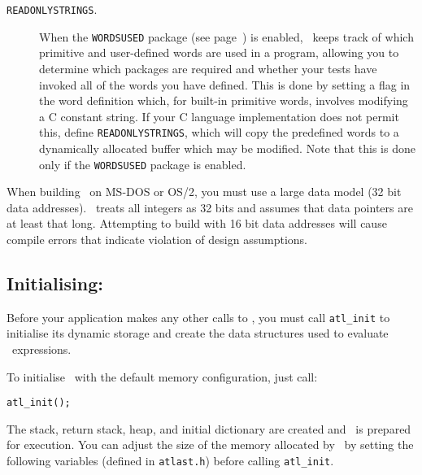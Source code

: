 \documentclass[twocolumn]{article}
\begin{document}
\begin{description}
\item[{\tt READONLYSTRINGS}.] When the {\tt WORDSUSED} package (see
		    page~\pageref{`wordsused'}) is enabled, \atlast\ 
		    keeps track of which primitive and user-defined
		    words are used in a program, allowing you to
		    determine which packages are required and whether
		    your tests have invoked all of the words you have
		    defined. This is done by setting a flag in the
		    word definition which, for built-in primitive
		    words, involves modifying a C constant string.  If
		    your C language implementation does not permit
		    this, define {\tt READONLYSTRINGS}, which will
		    copy the predefined words to a dynamically
		    allocated buffer which may be modified. Note that
		    this is done only if the {\tt WORDSUSED} package
		    is enabled.

\end{description}

When building \atlast\ on MS-DOS or OS/2, you must use a large data
model (32 bit data addresses).  \atlast\ treats all integers as 32
bits and assumes that data pointers are at least that long.
Attempting to build with 16 bit data addresses will cause compile
errors that indicate violation of design assumptions.

\subsection{Initialising: }

Before your application makes any other calls to \atlast , you must
call \verb+atl_init+ to initialise its dynamic storage and create
the data structures used to evaluate \atlast\ expressions.

To initialise \atlast\ with the default memory configuration, just
call:

\verb+atl_init();+

The stack, return stack, heap, and initial dictionary are created and
\atlast\ is prepared for execution.  You can adjust the size of the
memory allocated by \atlast\ by setting the following variables
(defined in {\tt atlast.h}) before calling \verb+atl_init+.
\label{`memall'}
\end{document}
